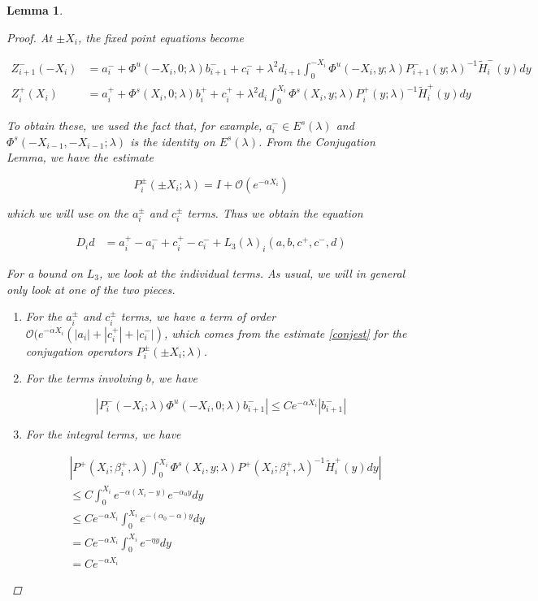 \documentclass[12pt]{article}
\newtheorem{lemma}{Lemma}
\begin{document}
\begin{lemma}
\begin{proof}
At $\pm X_i$, the fixed point equations become

\begin{align*}
Z_{i+1}^-(-X_i) &= a_i^- + \Phi^u(-X_i, 0; \lambda) b_{i+1}^- + c_i^- 
+ \lambda^2 d_{i+1} \int_0^{-X_i} \Phi^u(-X_i, y; \lambda) P_{i+1}^-(y; \lambda)^{-1} \tilde{H}_i^-(y) dy \\
Z_i^+(X_i) &= a_i^+ + \Phi^s(X_i, 0; \lambda) b_i^+ + c_i^+ 
+ \lambda^2 d_i \int_0^{X_i} \Phi^s(X_i, y; \lambda) P_i^+(y; \lambda)^{-1} \tilde{H}_i^+(y) dy
\end{align*}

To obtain these, we used the fact that, for example, $a_i^- \in E^s(\lambda)$ and $\Phi^s(-X_{i-1}, -X_{i-1}; \lambda)$ is the identity on $E^s(\lambda)$. From the Conjugation Lemma, we have the estimate

\begin{equation}\label{conjest}
P_i^\pm(\pm X_i; \lambda) = I + \mathcal{O}(e^{-\alpha X_i})
\end{equation}

which we will use on the $a_i^\pm$ and $c_i^\pm$ terms. Thus we obtain the equation

\begin{align}\label{Dideq1}
D_i d &= a_i^+ - a_i^- + c_i^+ - c_i^- + L_3(\lambda)_i(a, b, c^+, c^-, d)
\end{align}

For a bound on $L_3$, we look at the individual terms. As usual, we will in general only look at one of the two pieces.

\begin{enumerate}

\item For the $a_i^\pm$ and $c_i^\pm$ terms, we have a term of order $\mathcal{O}(e^{-\alpha X_i}(|a_i| + |c_i^+| + |c_i^-|)$, which comes from the estimate \eqref{conjest} for the conjugation operators $P_i^\pm(\pm X_i; \lambda)$.

\item For the terms involving $b$, we have

\[
| P_i^-(-X_i; \lambda) \Phi^u(-X_i, 0; \lambda) b_{i+1}^-| \leq C e^{-\alpha X_i} |b_{i+1}
^-|
\]

\item For the integral terms, we have

\begin{align*}
&\left|
P^+(X_i; \beta_i^+, \lambda) \int_0^{X_i} \Phi^s(X_i, y; \lambda) P^+(X_i; \beta_i^+, \lambda)^{-1} \tilde{H}_i^+(y) dy \right| \\
&\leq C \int_0^{X_i} e^{-\alpha(X_i - y)}e^{-\alpha_0 y} dy \\
&\leq C e^{-\alpha X_i} \int_0^{X_i} e^{-(\alpha_0 - \alpha)y} dy \\
&= C e^{-\alpha X_i} \int_0^{X_i} e^{-\eta y} dy \\ 
&= C e^{-\alpha X_i}
\end{align*}


\end{enumerate}
\end{proof}
\end{lemma}
\end{document}
